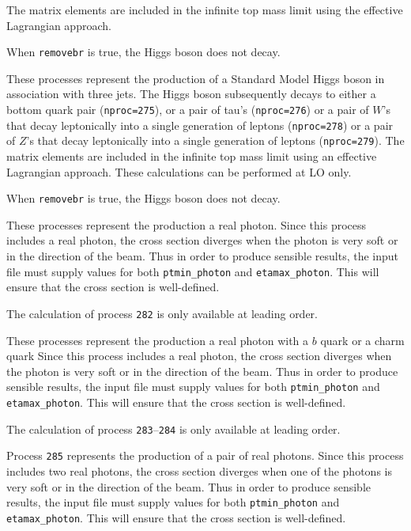 The matrix elements are included in the infinite top mass limit
using the effective Lagrangian approach. 

When {\tt removebr} is true, the Higgs boson does not decay.


These processes represent the production of a Standard Model Higgs boson
in association with three jets. The Higgs boson
subsequently decays to either a bottom quark pair ({\tt nproc=275}), 
or a pair of tau's ({\tt nproc=276})
or a pair of $W$'s that decay leptonically into a single generation of leptons ({\tt nproc=278})
or a pair of $Z$'s that decay leptonically into a single generation of leptons ({\tt nproc=279}).
The matrix elements are included in the infinite top mass limit
using an effective Lagrangian approach. These calculations can be
performed at LO only.

When {\tt removebr} is true, the Higgs boson does not decay.

\label{subsec:dirphot}

These processes represent the production a real photon.
Since this process includes a real photon, the cross section diverges
when the photon is very soft or in the direction of the beam.
Thus in order to produce sensible results, the input file must supply values for both
{\tt ptmin\_photon} and {\tt etamax\_photon}. This will ensure that
the cross section is well-defined.

The calculation of process {\tt 282} is only available at leading order.

\label{subsec:heavyfl}

These processes represent the production a real photon with a $b$ quark
or a charm quark
Since this process includes a real photon, the cross section diverges
when the photon is very soft or in the direction of the beam.
Thus in order to produce sensible results, the input file must supply values for both
{\tt ptmin\_photon} and {\tt etamax\_photon}. This will ensure that
the cross section is well-defined.

The calculation of process {\tt 283}--{\tt 284} is only available at leading order.

\label{subsec:gamgam}

Process {\tt 285} represents the production of a pair of real photons.
Since this process includes two real photons, the cross section diverges
when one of the photons is very soft or in the direction of the beam.
Thus in order to produce sensible results, the input file must supply values for both
{\tt ptmin\_photon} and {\tt etamax\_photon}. This will ensure that
the cross section is well-defined.

